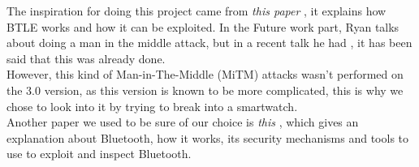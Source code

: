 The inspiration for doing this project came from \textit{this paper} \cite{mryan2014ble}, it explains how BTLE works and how it can be exploited. In the Future work part, Ryan talks about doing a man in the middle attack, but in a recent talk he had \cite{hitbox_mike_ryan}, it has been said that this was already done. \\
However, this kind of Man-in-The-Middle (MiTM) attacks wasn't performed on the 3.0 version, as this version is known to be more complicated, this is why we chose to look into it by trying to break into a smartwatch.\\
Another paper we used to be sure of our choice is \textit{this} \cite{chai20126}, which gives an explanation about Bluetooth, how it works, its security mechanisms and tools to use to exploit and inspect Bluetooth. 